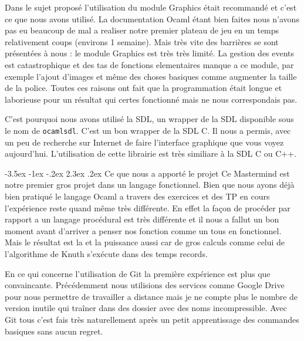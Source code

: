 \documentclass[11pt, a4paper]{article}
\makeatletter
\renewcommand{\section}{\@startsection{section}{1}{\z@}%
          {-3.5ex \@plus -1ex \@minus -.2ex}%
          {2.3ex \@plus .2ex}%
          {\reset@font\Large\bfseries	}}
\makeatother
\begin{document}
\vspace{3  mm}

Dans le sujet proposé l’utilisation du module Graphics était recommandé et c’est ce que nous avons utilisé. 
La documentation Ocaml étant bien faites nous n’avons pas eu beaucoup de mal a realiser notre premier plateau de jeu en un temps relativement coups (environs 1 semaine). 
Mais très vite des barrières se sont présentées à nous : le module Graphics est très très limité. 
La gestion des events est catastrophique et des tas de fonctions elementaires manque a ce module, par exemple l’ajout d’images et même des choses basiques 
comme augmenter la taille de la police. Toutes ces raisons ont fait que la programmation était longue et laborieuse pour un résultat qui certes fonctionné mais ne nous correspondais pas.

\vspace{3  mm}

C'est pourquoi nous avons utilisé la SDL, un wrapper de la SDL disponible sous le nom de \texttt{ocamlsdl}. C'est un bon wrapper de la SDL C.
Il nous a permis, avec un peu de recherche sur Internet de faire l'interface graphique que vous voyez aujourd'hui. 
L'utilisation de cette librairie est très similiare à la SDL C ou C++.

\section{Ce que nous a apporté le projet} 
Ce Mastermind est notre premier gros projet dans un langage fonctionnel. Bien que nous ayons déjà bien pratiqué le langage Ocaml a travers des exercices et des 
TP en cours l’expérience reste quand même très différente. En effet la façon de procéder par rapport a un langage procédural est très différente et il nous a fallut 
un bon moment avant d’arriver a penser nos fonction comme un tous en fonctionnel. Mais le résultat est la et la puissance aussi car de gros calculs comme celui de
l’algorithme de Knuth s’exécute dans des temps records.

\vspace{3  mm}

En ce qui concerne l’utilisation de Git la première expérience est plus que convaincante. Précédemment nous utilisions des services
comme Google Drive pour nous permettre de travailler a distance mais je ne compte plus le nombre de version inutile qui traîner dans des
dossier avec des noms incompressible. Avec Git tous c’est fais très naturellement après un petit apprentissage des commandes basiques sans aucun regret. 
\newpage
\end{document}
